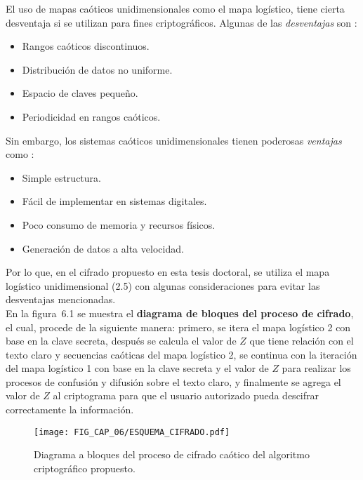 El uso de mapas caóticos unidimensionales como el mapa logístico, tiene cierta desventaja si se utilizan para fines criptográficos. Algunas de las \textit{desventajas} son \cite{AEtAl_2008}:
\begin{itemize}
\item Rangos caóticos discontinuos.
\item Distribución de datos no uniforme.
\item Espacio de claves pequeño.
\item Periodicidad en rangos caóticos.  \\
\end{itemize}

Sin embargo, los sistemas caóticos unidimensionales tienen poderosas \textit{ventajas} como \cite{CyV_2017}:
\begin{itemize}
\item Simple estructura.
\item Fácil de implementar en sistemas digitales.
\item Poco consumo de memoria y recursos físicos.
\item Generación de datos a alta velocidad.  \\
\end{itemize}

Por lo que, en el cifrado propuesto en esta tesis doctoral, se utiliza el mapa logístico unidimensional (2.5) con algunas consideraciones para evitar las desventajas mencionadas. \\  

En la figura~6.1 se muestra el \textbf{diagrama de bloques del proceso de cifrado}, el cual, procede de la siguiente manera: primero, se itera el mapa logístico 2 con base en la clave secreta, después se calcula el valor de $Z$ que tiene relación con el texto claro y secuencias caóticas del mapa logístico 2, se continua con la iteración del mapa logístico 1 con base en la clave secreta y el valor de $Z$ para realizar los procesos de confusión y difusión sobre el texto claro, y finalmente se agrega el valor de $Z$ al criptograma para que el usuario autorizado pueda descifrar correctamente la información.    \\  

\begin{figure}[!htbp] %
	\center
	\texttt{[image: FIG\_CAP\_06/ESQUEMA\_CIFRADO.pdf]}   
	\caption{Diagrama a bloques del proceso de cifrado caótico del algoritmo criptográfico propuesto.}
\end{figure}

